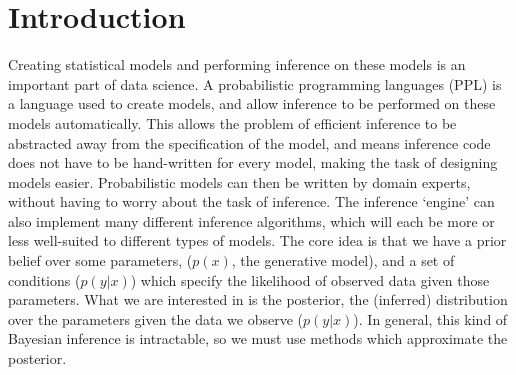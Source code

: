 \chapter{Introduction}

Creating statistical models and performing inference on these models is an important part of data science. A probabilistic programming languages (PPL) is a language used to create models, and allow inference to be performed on these models automatically. This allows the problem of efficient inference to be abstracted away from the specification of the model, and means inference code does not have to be hand-written for every model, making the task of designing models easier. Probabilistic models can then be written by domain experts, without having to worry about the task of inference. The inference `engine' can also implement many different inference algorithms, which will each be more or less well-suited to different types of models. The core idea is that we have a prior belief over some parameters, ($p(x)$, the generative model), and a set of conditions ($p(y|x)$) which specify the likelihood of observed data given those parameters. What we are interested in is the posterior, the (inferred) distribution over the parameters given the data we observe ($p(y|x)$). In general, this kind of Bayesian inference is intractable, so we must use methods which approximate the posterior.


